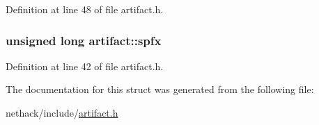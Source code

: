 Definition at line 48 of file artifact.\+h.

\hypertarget{structartifact_aa3cd121c063fb3990f5b26c66afbbc1b}{
\subsubsection[{spfx}]{\setlength{\rightskip}{0pt plus 5cm}unsigned long artifact\+::spfx}}\label{structartifact_aa3cd121c063fb3990f5b26c66afbbc1b}


Definition at line 42 of file artifact.\+h.



The documentation for this struct was generated from the following file\+:\begin{DoxyCompactItemize}
\item 
nethack/include/\hyperlink{artifact_8h}{artifact.\+h}\end{DoxyCompactItemize}
